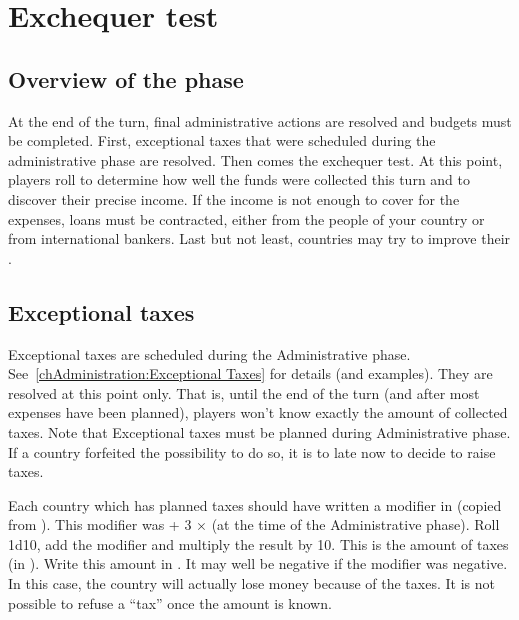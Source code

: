 
\chapter{Exchequer test}\label{chapter:Budget}

\section{Overview of the phase}

\aparag[Administration] At the end of the turn, final administrative actions
are resolved and budgets must be completed. First, exceptional taxes that were
scheduled during the administrative phase are resolved. Then comes the
exchequer test. At this point, players roll to determine how well the funds
were collected this turn and to discover their precise income. If the income
is not enough to cover for the expenses, loans must be contracted, either from
the people of your country or from international bankers. Last but not least,
countries may try to improve their \STAB.

\ExchequerDetails

\section{Exceptional taxes}\label{chBudget:Exceptional taxes}
 Exceptional taxes are scheduled during the
Administrative phase. See~\ref{chAdministration:Exceptional Taxes} for details
(and examples). They are resolved at this point only. That is, until the end
of the turn (and after most expenses have been planned), players won't know
exactly the amount of collected taxes.
\bparag Note that Exceptional taxes must be planned during Administrative
phase. If a country forfeited the possibility to do so, it is to late now to
decide to raise taxes.

\bparag Each country which has planned taxes should have written a modifier in
 (copied from
). This modifier was \ADM + 3
$\times$ \STAB (at the time of the Administrative phase).
\bparag Roll 1d10, add the modifier and multiply the result by 10. This is the
amount of taxes (in \ducats).
\bparag Write this amount in . It may well be
negative if the modifier was negative. In this case, the country will actually
lose money because of the taxes. It is not possible to refuse a ``tax'' once
the amount is known.

